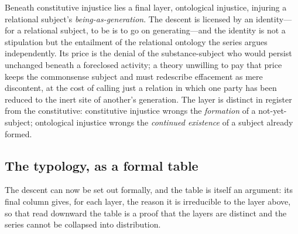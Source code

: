 \begin{claim}
Beneath constitutive injustice lies a final layer, ontological injustice, injuring a relational subject's \emph{being-as-generation}. The descent is licensed by an identity---for a relational subject, to be is to go on generating---and the identity is not a stipulation but the entailment of the relational ontology the series argues independently. Its price is the denial of the substance-subject who would persist unchanged beneath a foreclosed activity; a theory unwilling to pay that price keeps the commonsense subject and must redescribe effacement as mere discontent, at the cost of calling just a relation in which one party has been reduced to the inert site of another's generation. The layer is distinct in register from the constitutive: constitutive injustice wrongs the \emph{formation} of a not-yet-subject; ontological injustice wrongs the \emph{continued existence} of a subject already formed.
\end{claim}

\subsection{The typology, as a formal table}
\label{p18:sub:typ-table}

The descent can now be set out formally, and the table is itself an argument: its final column gives, for each layer, the reason it is irreducible to the layer above, so that read downward the table is a proof that the layers are distinct and the series cannot be collapsed into distribution.

